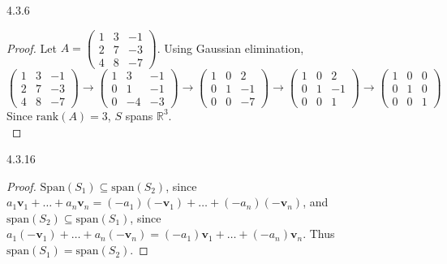 \documentclass{article}
\theoremstyle{definition}
\begin{document}
	\begin{prob}{4.3.6} $  $
		\begin{proof}
			Let $ A = \begin{pmatrix} 1 & 3 & -1 \\ 2 & 7 & -3 \\ 4 & 8 & -7 \end{pmatrix} $. Using Gaussian elimination, 
			\[
				\begin{pmatrix} 1 & 3 & -1 \\ 2 & 7 & -3 \\ 4 & 8 & -7 \end{pmatrix} \to
				\begin{pmatrix} 1 & 3 & -1 \\ 0 & 1 & -1 \\ 0 & -4 & -3 \end{pmatrix} \to
				\begin{pmatrix} 1 & 0 & 2 \\ 0 & 1 & -1 \\ 0 & 0 & -7 \end{pmatrix} \to
				\begin{pmatrix} 1 & 0 & 2 \\ 0 & 1 & -1 \\ 0 & 0 & 1 \end{pmatrix} \to
				\begin{pmatrix} 1 & 0 & 0 \\ 0 & 1 & 0 \\ 0 & 0 & 1 \end{pmatrix}
			\]
			Since $ \text{rank}(A) = 3 $, $ S $ spans $ \mathbb{R}^3 $.\\
		\end{proof}
	\end{prob}

	\begin{prob}{4.3.16} $  $
		\begin{proof}
			$ \text{Span}(S_1) \subseteq \text{span}(S_2) $, since $ a_1\mathbf{v}_1 + \dots + a_n\mathbf{v}_n = (-a_1)(-\mathbf{v}_1) + \dots + (-a_n)(-\mathbf{v}_n) $, and $ \text{span}(S_2) \subseteq \text{span}(S_1) $, since $ a_1(-\mathbf{v}_1) + \dots + a_n(-\mathbf{v}_n) = (-a_1)\mathbf{v}_1 + \dots + (-a_n)\mathbf{v}_n $. Thus $ \text{span}(S_1) = \text{span}(S_2) $.
		\end{proof}
	\end{prob}
\end{document}
